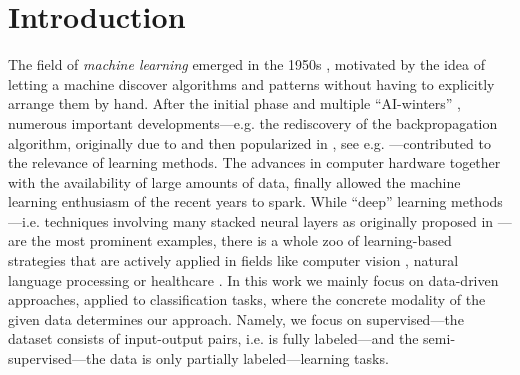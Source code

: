 \chapter{Introduction}
%
%
The field of \textit{machine learning} emerged in the 1950s \cite{samuel1959some, rosenblatt1958perceptron}, motivated by the idea of letting a machine discover algorithms and patterns without having to explicitly arrange them by hand. After the initial phase and multiple \enquote{AI-winters} \cite{steele1996evolution}, numerous important developments---e.g. the rediscovery of the backpropagation algorithm, originally due to \cite{kelley1960gradient,rosenblatt1962principles} and then popularized in \cite{rumelhart1986learning}, see e.g. \cite{schmidhuber2022annotated}---contributed to the relevance of learning methods. The advances in computer hardware together with the availability of large amounts of data, finally allowed the machine learning enthusiasm of the recent years to spark. While \enquote{deep} learning methods---i.e. techniques involving many stacked neural layers as originally proposed in \cite{rosenblatt1958perceptron}---are the most prominent examples, there is a whole zoo of learning-based strategies that are actively applied in fields like computer vision \cite{chai2021deep}, natural language processing \cite{khurana2023natural} or healthcare \cite{shehab2022machine}. In this work we mainly focus on data-driven approaches, applied to classification tasks, where the concrete modality of the given data determines our approach. Namely, we focus on supervised---the dataset consists of input-output pairs, i.e. is fully labeled---and the semi-supervised---the data is only partially labeled---learning tasks.

